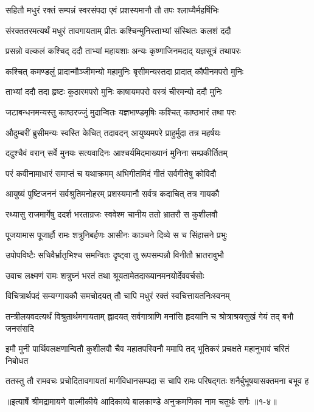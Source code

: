 \twolineshloka
{सहितौ मधुरं रक्तं सम्पन्नं स्वरसंपदा}
{एवं प्रशस्यमानौ तौ तपः श्लाघ्यैर्महर्षिभिः} %

\twolineshloka
{संरक्ततरमत्यर्थं मधुरं तावगायताम्}
{प्रीतः कश्चिन्मुनिस्ताभ्यां संस्थितः कलशं ददौ} %

\twolineshloka
{प्रसन्नो वल्कलं कश्चिद् ददौ ताभ्यां महायशाः}
{अन्यः कृष्णाजिनमदाद् यज्ञसूत्रं तथापरः} %

\twolineshloka
{कश्चित् कमण्डलुं प्रादान्मौञ्जीमन्यो महामुनिः}
{बृसीमन्यस्तदा प्रादात् कौपीनमपरो मुनिः} %

\twolineshloka
{ताभ्यां ददौ तदा हृष्टः कुठारमपरो मुनिः}
{काषायमपरो वस्त्रं चीरमन्यो ददौ मुनिः} %

\twolineshloka
{जटाबन्धनमन्यस्तु काष्ठरज्जुं मुदान्वितः}
{यज्ञभाण्डमृषिः कश्चित् काष्ठभारं तथा परः} %

\twolineshloka
{औदुम्बरीं ब्रुसीमन्यः स्वस्ति केचित् तदावदन्}
{आयुष्यमपरे प्राहुर्मुदा तत्र महर्षयः} %

\twolineshloka
{ददुश्चैवं वरान् सर्वे मुनयः सत्यवादिनः}
{आश्चर्यमिदमाख्यानं मुनिना सम्प्रकीर्तितम्} %

\twolineshloka
{परं कवीनामाधारं समाप्तं च यथाक्रमम्}
{अभिगीतमिदं गीतं सर्वगीतेषु कोविदौ} %

\twolineshloka
{आयुष्यं पुष्टिजननं सर्वश्रुतिमनोहरम्}
{प्रशस्यमानौ सर्वत्र कदाचित् तत्र गायकौ} %

\twolineshloka
{रथ्यासु राजमार्गेषु ददर्श भरताग्रजः}
{स्ववेश्म चानीय ततो भ्रातरौ स कुशीलवौ} %

\twolineshloka
{पूजयामास पूजार्हौ रामः शत्रुनिबर्हणः}
{आसीनः काञ्चने दिव्ये स च सिंहासने प्रभुः} %

\twolineshloka
{उपोपविष्टैः सचिवैर्भ्रातृभिश्च समन्वितः}
{दृष्ट्वा तु रूपसम्पन्नौ विनीतौ भ्रातरावुभौ} %

\twolineshloka
{उवाच लक्ष्मणं रामः शत्रुघ्नं भरतं तथा}
{श्रूयतामेतदाख्यानमनयोर्देववर्चसोः} %

\twolineshloka
{विचित्रार्थपदं सम्यग्गायकौ समचोदयत्}
{तौ चापि मधुरं रक्तं स्वचित्तायतनिःस्वनम्} %

\threelineshloka
{तन्त्रीलयवदत्यर्थं विश्रुतार्थमगायताम्}
{ह्लादयत् सर्वगात्राणि मनांसि हृदयानि च}
{श्रोत्राश्रयसुखं गेयं तद् बभौ जनसंसदि} %

\fourlineindentedshloka
{इमौ मुनी पार्थिवलक्षणान्वितौ}
{कुशीलवौ चैव महातपस्विनौ}
{ममापि तद् भूतिकरं प्रचक्षते}
{महानुभावं चरितं निबोधत} %

\twolineshloka
{ततस्तु तौ रामवचः प्रचोदितावगायतां मार्गविधानसम्पदा}
{स चापि रामः परिषद्गतः शनैर्बुभूषयासक्तमना बभूव ह} %


॥इत्यार्षे श्रीमद्रामायणे वाल्मीकीये आदिकाव्ये बालकाण्डे अनुक्रमणिका नाम चतुर्थः सर्गः ॥१-४॥
